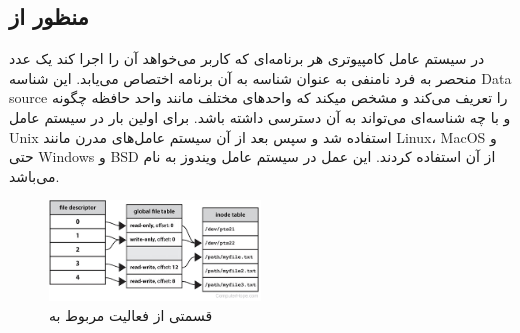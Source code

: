 \documentclass[10pt, a4paper]{article}
\begin{document}
\subsection{منظور از }

در سیستم عامل کامپیوتری هر برنامه‌ای که کاربر می‌خواهد آن را اجرا کند یک عدد
منحصر به فرد نامنفی به عنوان شناسه به آن برنامه اختصاص می‌یابد. این شناسه Data
source را تعریف می‌کند و مشخص میکند که واحد‌های مختلف مانند واحد حافظه چگونه و
با چه شناسه‌ای می‌تواند به آن دسترسی داشته باشد.  برای اولین
بار در سیستم عامل Unix استفاده شد و سپس بعد از آن سیستم عامل‌های مدرن مانند
Linux، MacOS و حتی Windows و BSD از آن استفاده کردند. این عمل در سیستم عامل
ویندوز به نام  می‌باشد.

\begin{figure}
    \centering
    \includegraphics[width=0.5\textwidth]{figs/file_descriptor.png}
    \caption{قسمتی از فعالیت مربوط به }
    \label{fig: diagram}
\end{figure}



\end{document}
